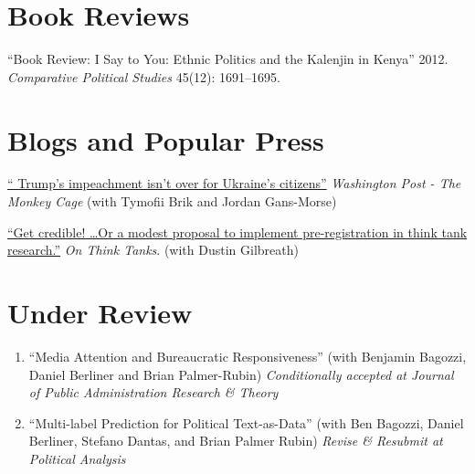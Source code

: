 \documentclass[margin,line]{res}
\begin{document}
{\begin{resume}
 
\section{\sc Book Reviews}
\renewcommand{\labelenumi}{R\theenumi.}

\begin{etaremune}
``Book Review: I Say to You: Ethnic Politics and the Kalenjin in
Kenya'' 2012. \emph{Comparative Political Studies} 45(12): 1691--1695.
\end{etaremune}

\section{\sc Blogs and Popular Press}
\renewcommand{\labelenumi}{M\theenumi.}

\begin{etaremune}

\item \href{https://www.washingtonpost.com/politics/2020/02/19/trumps-impeachment-isnt-over-ukraines-citizens/}{``
  Trump’s impeachment isn’t over for Ukraine’s citizens''}
\emph{Washington Post - The Monkey Cage} (with Tymofii Brik and Jordan
Gans-Morse)

\item \href{https://onthinktanks.org/articles/get-credible-or-a-modest-proposal-to-implement-pre-registration-in-think-tank-research/}{``Get
credible! …Or a modest proposal to implement pre-registration in think
tank research.''} \emph{On Think Tanks}. (with Dustin Gilbreath)
\end{etaremune}

\section{\sc Under Review}
\renewcommand{\labelenumi}{UR\theenumi.}

\begin{enumerate}

\item ``Media Attention and Bureaucratic Responsiveness'' (with Benjamin
  Bagozzi, Daniel Berliner and Brian Palmer-Rubin)
  \textit{Conditionally accepted at Journal of Public Administration
    Research \& Theory}

\item  ``Multi-label Prediction for Political Text-as-Data'' (with Ben Bagozzi, Daniel Berliner,
  Stefano Dantas, and Brian Palmer Rubin) \textit{Revise \& Resubmit
    at Political Analysis }


\end{enumerate}
\end{resume}}
\end{document}
